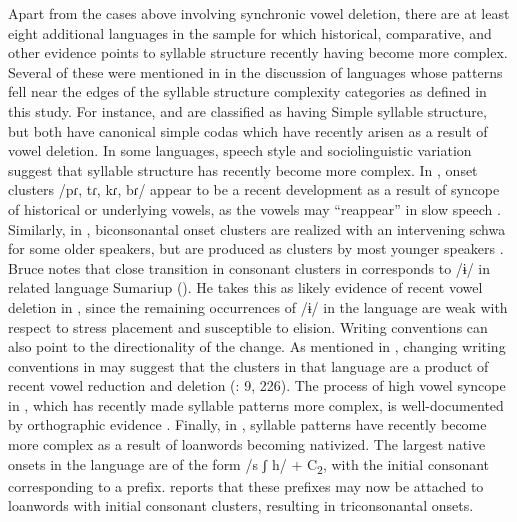  Apart from the cases above involving synchronic vowel deletion, there are at least eight additional languages in the sample for which historical, comparative, and other evidence points to syllable structure recently having become more complex. Several of these were mentioned in  in the discussion of languages whose patterns fell near the edges of the syllable structure complexity categories as defined in this study. For instance,  and  are classified as having Simple syllable structure, but both have canonical simple codas which have recently arisen as a result of vowel deletion. In some languages, speech style and sociolinguistic variation suggest that syllable structure has recently become more complex. In , onset clusters /pɾ, tɾ, kɾ, bɾ/ appear to be a recent development as a result of syncope of historical or underlying vowels, as the vowels may “reappear” in slow speech \citep[20]{Holt1999}. Similarly, in , biconsonantal onset clusters are realized with an intervening schwa for some older speakers, but are produced as clusters by most younger speakers \citep[65-67]{Loughnane2009}. Bruce notes that close transition in consonant clusters in  corresponds to /ɨ/ in related language Sumariup (\citeyear[69--70]{Bruce1984}). He takes this as likely evidence of recent vowel deletion in , since the remaining occurrences of /ɨ/ in the language are weak with respect to stress placement and susceptible to elision. Writing conventions can also point to the directionality of the change. As mentioned in , changing writing conventions in  may suggest that the clusters in that language are a product of recent vowel reduction and deletion (\citealt{Whitehead2004}: 9, 226). The process of high vowel syncope in , which has recently made syllable patterns more complex, is well-documented by orthographic evidence \citep[36-38]{Haspelmath1993}. Finally, in , syllable patterns have recently become more complex as a result of loanwords becoming nativized. The largest native onsets in the language are of the form /s ʃ h/ + C\textsubscript{2}, with the initial consonant corresponding to a prefix. \citep[14]{Kaufman1971} reports that these prefixes may now be attached to  loanwords with initial consonant clusters, resulting in triconsonantal onsets.

